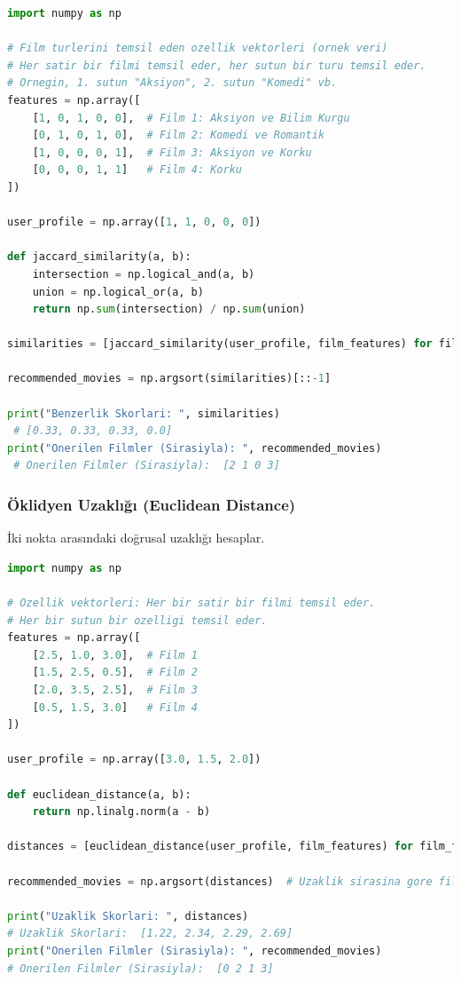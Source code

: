 \begin{lstlisting}[language=Python]
import numpy as np

# Film turlerini temsil eden ozellik vektorleri (ornek veri)
# Her satir bir filmi temsil eder, her sutun bir turu temsil eder.
# Ornegin, 1. sutun "Aksiyon", 2. sutun "Komedi" vb.
features = np.array([
    [1, 0, 1, 0, 0],  # Film 1: Aksiyon ve Bilim Kurgu
    [0, 1, 0, 1, 0],  # Film 2: Komedi ve Romantik
    [1, 0, 0, 0, 1],  # Film 3: Aksiyon ve Korku
    [0, 0, 0, 1, 1]   # Film 4: Korku
])

user_profile = np.array([1, 1, 0, 0, 0])

def jaccard_similarity(a, b):
    intersection = np.logical_and(a, b)
    union = np.logical_or(a, b)
    return np.sum(intersection) / np.sum(union)

similarities = [jaccard_similarity(user_profile, film_features) for film_features in features]

recommended_movies = np.argsort(similarities)[::-1]

print("Benzerlik Skorlari: ", similarities)
 # [0.33, 0.33, 0.33, 0.0]
print("Onerilen Filmler (Sirasiyla): ", recommended_movies)
 # Onerilen Filmler (Sirasiyla):  [2 1 0 3]
\end{lstlisting}

\newpage

\subsubsection{Öklidyen Uzaklığı (Euclidean Distance)}

İki nokta arasındaki doğrusal uzaklığı hesaplar.

\begin{lstlisting}[language=Python]
import numpy as np

# Ozellik vektorleri: Her bir satir bir filmi temsil eder.
# Her bir sutun bir ozelligi temsil eder.
features = np.array([
    [2.5, 1.0, 3.0],  # Film 1
    [1.5, 2.5, 0.5],  # Film 2
    [2.0, 3.5, 2.5],  # Film 3
    [0.5, 1.5, 3.0]   # Film 4
])

user_profile = np.array([3.0, 1.5, 2.0])

def euclidean_distance(a, b):
    return np.linalg.norm(a - b)

distances = [euclidean_distance(user_profile, film_features) for film_features in features]

recommended_movies = np.argsort(distances)  # Uzaklik sirasina gore filmleri sirala

print("Uzaklik Skorlari: ", distances)
# Uzaklik Skorlari:  [1.22, 2.34, 2.29, 2.69]
print("Onerilen Filmler (Sirasiyla): ", recommended_movies)
# Onerilen Filmler (Sirasiyla):  [0 2 1 3]
\end{lstlisting}

